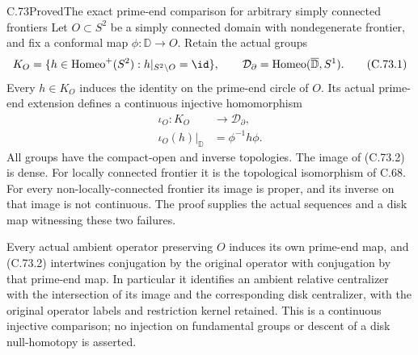 \begin{claim}{C.73}{Proved}{The exact prime-end comparison for arbitrary simply connected frontiers}
Let $O\subset S^2$ be a simply connected domain with
nondegenerate frontier, and fix a conformal map
$\phi:\mathbb D\to O$. Retain the actual groups
\[
 K_O=\{h\in\operatorname{Homeo}^+(S^2):
                    h|_{S^2\setminus O}=\id\},
             \qquad \mathcal D_\partial
                 =\operatorname{Homeo}(\overline{\mathbb D},S^1).
                                                               \tag{C.73.1}
\]
Every $h\in K_O$ induces the identity on the prime-end
circle of $O$. Its actual prime-end extension defines a
continuous injective homomorphism
\[
 \begin{split}
 \iota_O:K_O&\longrightarrow\mathcal D_\partial,\\
 \iota_O(h)|_{\mathbb D}&=\phi^{-1}h\phi .
 \end{split}                                                   \tag{C.73.2}
\]
All groups have the compact-open and inverse topologies.
The image of (C.73.2) is dense. For locally connected
frontier it is the topological isomorphism of C.68.
For every non-locally-connected frontier its image is
proper, and its inverse on that image is not continuous.
The proof supplies the actual sequences and a disk map
witnessing these two failures.

Every actual ambient operator preserving $O$ induces
its own prime-end map, and (C.73.2) intertwines
conjugation by the original operator with conjugation
by that prime-end map. In particular it identifies
an ambient relative centralizer with the intersection
of its image and the corresponding disk centralizer,
with the original operator labels and restriction
kernel retained. This is a continuous injective
comparison; no injection on fundamental groups or
descent of a disk null-homotopy is asserted.
\end{claim}


